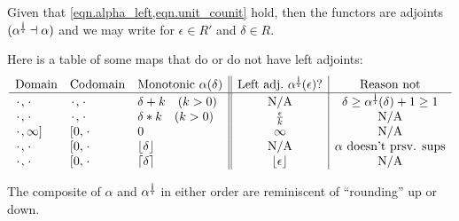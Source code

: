 \documentclass[11pt, one side, article]{memoir}
\theoremstyle{definition}
\theoremstyle{plain}
\newenvironment{example}
  {\pushQED{\qed}\renewcommand{\qedsymbol}{$\lozenge$}\examplex}
  {\popQED\endexamplex}
\DeclarePairedDelimiter{\floor}{\lfloor}{\rfloor}
\DeclarePairedDelimiter{\ceil}{\lceil}{\rceil}
\newcommand{\ldag}{^{\rotatebox{180}{$\dagger$}}}
\newcommand{\blank}[1][1pt]{\hspace{#1}\cdot\hspace{#1}}
\newcommand{\flr}[2][\blank]{\floor{#1}_{#2}}
\newcommand{\clg}[2][\blank]{\ceil{#1}_{#2}}
\begin{document}
Given that \cref{eqn.alpha_left,eqn.unit_counit} hold, then the functors are adjoints $(\alpha\ldag\dashv\alpha)$ and we may write
for $\epsilon\in R'$ and $\delta\in R$.

\begin{example}
Here is a table of some maps that do or do not have left adjoints:
\[
\begin{array}{lll||c|c}
	\text{Domain}&\text{Codomain}&\text{Monotonic $\alpha(\delta)$}&\text{Left adj.\ }\alpha\ldag(\epsilon)?&\text{Reason not}\\\hline
	\blank,\blank&\blank,\blank&\delta+k \quad(k>0)&\text{N/A}&\delta\geq\alpha\ldag(\delta)+1\geq1\\
	\blank,\blank&\blank,\blank&\delta*k \quad(k>0)&\frac{\epsilon}{k}&\text{N/A}\\
	\blank,\infty]&[0,\blank&0&\infty&\text{N/A}\\
	\blank,\blank&[0,\blank&\flr[\delta]{}&\text{N/A}&\alpha\text{ doesn't prsv. sups}\\
	\blank,\blank&[0,\blank&\clg[\delta]{}&\flr[\epsilon]{}&\text{N/A}
\end{array}
\]
\end{example}

The composite of $\alpha$ and $\alpha\ldag$ in either order are reminiscent of ``rounding'' up or down.
\end{document}
